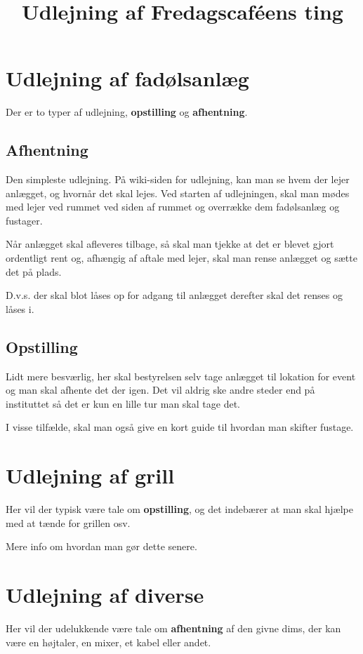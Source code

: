 

\title{Udlejning af Fredagscaféens ting}



\maketitle

\section{Udlejning af fadølsanlæg}

Der er to typer af udlejning, \textbf{opstilling} og \textbf{afhentning}.

\subsection{Afhentning}
Den simpleste udlejning. På wiki-siden for udlejning, kan man se hvem der lejer anlægget, og hvornår det skal lejes. Ved starten af udlejningen, skal man mødes med lejer ved rummet ved siden af rummet og overrække dem fadølsanlæg og fustager.

Når anlægget skal afleveres tilbage, så skal man tjekke at det er blevet gjort ordentligt rent og, afhængig af aftale med lejer, skal man rense anlægget og sætte det på plads.

D.v.s. der skal blot låses op for adgang til anlægget derefter skal det renses og låses i.

\subsection{Opstilling}
Lidt mere besværlig, her skal bestyrelsen selv tage anlægget til lokation for event og man skal afhente det der igen. Det vil aldrig ske andre steder end på instituttet så det er kun en lille tur man skal tage det.

I visse tilfælde, skal man også give en kort guide til hvordan man skifter fustage.

\section{Udlejning af grill}
Her vil der typisk være tale om \textbf{opstilling}, og det indebærer at man skal hjælpe med at tænde for grillen osv.

Mere info om hvordan man gør dette senere.

\section{Udlejning af diverse}
Her vil der udelukkende være tale om \textbf{afhentning} af den givne dims, der kan være en højtaler, en mixer, et kabel eller andet.


